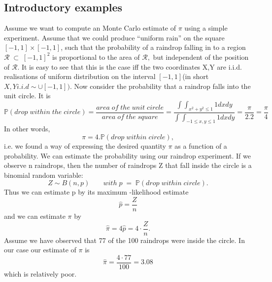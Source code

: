 \documentclass[a4paper,10pt]{article}
\newenvironment{example}[1][Example]{\begin{trivlist}
\item[\hskip \labelsep {\bfseries #1}]}{\end{trivlist}}
\begin{document}
\subsection{Introductory examples}
 \begin{example}[A raindrop experiment for computing $\pi$]\label{raindrop}
Assume we want to compute an Monte Carlo estimate of $\pi$ using a simple experiment. 
Assume that we could produce ``uniform rain'' on the square $[-1,1] \times [-1,1]$, such that
the probability of a raindrop falling in to a region $\mathcal{R} \;\subset\;[-1,1]^{2}$
is proportional to the area of $\mathcal{R},$ but independent of the position of
$\mathcal{R}$. It is easy to see that this is the case iff the two coordinates X,Y are i.i.d. realisations
of uniform distribution on the interval $[-1,1]$(in short $X,Y i.i.d\sim \cup[-1,1]).$
   Now consider the probability that a raindrop falls into the unit circle. It is
   \begin{equation*}
\mathbb{P}(drop\; within\; the\; circle) = \frac{area\; of \;the\; unit\; circle}{area\; of\; the \;square} = \frac{\int \int _{{x^2 + y^2 \leq 1}} 1 dxdy}{\int \int _{{-1
\leq x,y \leq 1} }1 dxdy} = \frac{\pi}{2.2} = \frac{\pi}{4}    
   \end{equation*}
In other words,
\begin{equation*}
 \pi = 4.\mathbb{P}(drop\;within\;circle),
\end{equation*}
i.e. we found a way of expressing the desired quantity $\pi$ as a function of a probability. 
We can estimate the probability using our raindrop experiment. If we observe n raindrops, then the number of raindrops
Z that fall inside the circle is a binomial random variable:
\begin{equation*}
 Z \sim B(n,p) \;\;\;\;\;\;\; with\;p\;=\;\mathbb{P}(drop\;within\;circle).
\end{equation*}
Thus we can estimate p by its maximum -likelihood estimate 
\begin{equation*}
 \hat{p} = \frac{Z}{n}
\end{equation*}
and we can estimate $\pi$ by 
\begin{equation*}
 \hat{\pi} = 4\hat{p} = 4\cdot\frac{Z}{n}.
\end{equation*}
Assume we have observed that 77 of the 100 raindrops were inside the circle. In our case our estimate of $\pi$
is 
\begin{equation*}
 \hat{\pi} = \frac{4 \cdot 77}{100} = 3.08
\end{equation*}
which is relatively poor.

\end{example}
\end{document}
